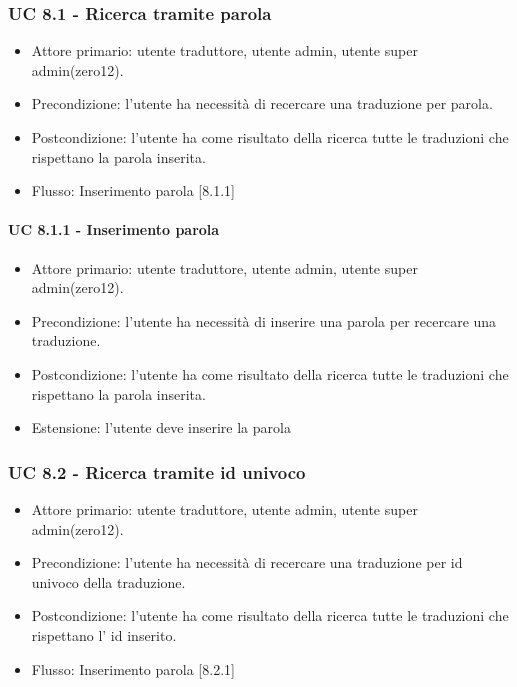     \subsubsection*{UC 8.1 - Ricerca tramite parola}
        \begin{itemize}
            \item Attore primario: utente traduttore, utente admin, utente super admin(zero12).
            \item Precondizione: l'utente ha necessità di recercare una traduzione per parola.
            \item Postcondizione: l'utente ha come risultato della ricerca tutte le traduzioni che rispettano la parola inserita.
            \item Flusso: Inserimento parola [8.1.1]
        \end{itemize}
        \paragraph*{UC 8.1.1 - Inserimento parola}
            \begin{itemize}
                \item Attore primario: utente traduttore, utente admin, utente super admin(zero12).
                \item Precondizione: l'utente ha necessità di inserire una parola per recercare una traduzione.
                \item Postcondizione: l'utente ha come risultato della ricerca tutte le traduzioni che rispettano la parola inserita.
                \item Estensione: l'utente deve inserire la parola
            \end{itemize}
    \subsubsection*{UC 8.2 - Ricerca tramite id univoco}
        \begin{itemize}
            \item Attore primario: utente traduttore, utente admin, utente super admin(zero12).
            \item Precondizione: l'utente ha necessità di recercare una traduzione per id univoco della traduzione.
            \item Postcondizione: l'utente ha come risultato della ricerca tutte le traduzioni che rispettano l' id inserito.
            \item Flusso: Inserimento parola [8.2.1]
        \end{itemize}

